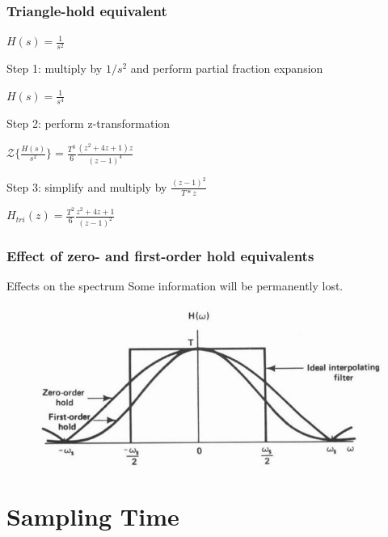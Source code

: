 \begin{frame}
	\frametitle{Triangle-hold equivalent}
	\begin{example}
		\begin{center}
			$H(s) = \frac{1}{s^{2}}$
		\end{center}
		Step 1: multiply by $1/s^{2}$ and perform partial fraction expansion
		\begin{center}
			$H(s) = \frac{1}{s^{4}}$
		\end{center}
		Step 2: perform z-transformation
		\begin{center}
			$\mathcal{Z}\{\frac{H(s)}{s^{2}}\} = \frac{T^{3}}{6} \frac{(z^{2} + 4z +1) z}{(z-1)^{4}}$
		\end{center}
		Step 3: simplify and multiply by $\frac{(z-1)^{2}}{T*z}$
		\begin{center}
			$H_{tri}(z) = \frac{T^{2}}{6} \frac{z^{2} + 4z + 1}{(z-1)^{2}}$
		\end{center}
	\end{example}
\end{frame}

\begin{frame}
	\frametitle{Effect of zero- and first-order hold equivalents}
	\begin{block}{Effects on the spectrum}
		Some information will be permanently lost.
		\vspace{-0.7em}
		\begin{figure}
			\centering
			\includegraphics[width=1\linewidth]{effect_zoh_foh}
		\end{figure}
	\end{block}
\end{frame}

\section{Sampling Time}

